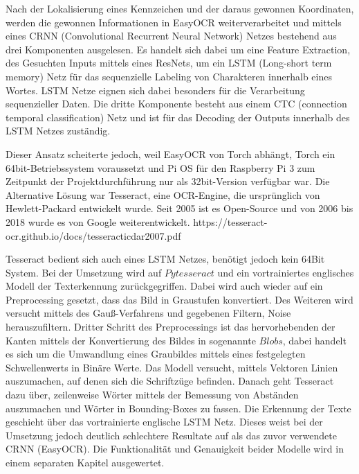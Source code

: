 Nach der Lokalisierung eines Kennzeichen und der daraus gewonnen Koordinaten, werden die gewonnen Informationen in EasyOCR weiterverarbeitet und mittels eines CRNN (Convolutional Recurrent Neural Network) Netzes bestehend aus drei Komponenten ausgelesen. Es handelt sich dabei um eine Feature Extraction, des Gesuchten Inputs mittels eines ResNets, um ein LSTM (Long-short term memory) Netz für das sequenzielle Labeling von Charakteren innerhalb eines Wortes. LSTM Netze eignen sich dabei besonders für die Verarbeitung sequenzieller Daten. Die dritte Komponente besteht aus einem CTC (connection temporal classification) Netz und ist für das Decoding der Outputs innerhalb des LSTM Netzes zuständig. \autocite[Vgl.][]{JaidedAI70}

Dieser Ansatz scheiterte jedoch, weil EasyOCR von Torch abhängt, Torch ein 64bit-Betriebssystem voraussetzt und Pi OS für den Raspberry Pi 3 zum Zeitpunkt der Projektdurchführung nur als 32bit-Version verfügbar war.
Die Alternative Lösung war Tesseract, eine OCR-Engine, die ursprünglich von Hewlett-Packard entwickelt wurde. Seit 2005 ist es Open-Source und von 2006 bis 2018 wurde es von Google weiterentwickelt. https://tesseract-ocr.github.io/docs/tesseracticdar2007.pdf %

Tesseract bedient sich auch eines LSTM Netzes, benötigt jedoch kein 64Bit System. Bei der Umsetzung wird auf $Pytesseract$ und ein vortrainiertes englisches Modell der Texterkennung zurückgegriffen. \autocite[Vgl.][]{Tesserac98}
Dabei wird auch wieder auf ein Preprocessing gesetzt, dass das Bild in Graustufen konvertiert. Des Weiteren wird versucht mittels des Gauß-Verfahrens und gegebenen Filtern, Noise herauszufiltern. Dritter Schritt des Preprocessings ist das hervorhebenden der Kanten mittels der Konvertierung des Bildes in sogenannte $Blobs$, dabei handelt es sich um die Umwandlung eines Graubildes mittels eines festgelegten Schwellenwerts in Binäre Werte. \autocite[Vgl.][]{8974469} %
Das Modell versucht, mittels Vektoren Linien auszumachen, auf denen sich die Schriftzüge befinden. Danach geht Tesseract dazu über, zeilenweise Wörter mittels der Bemessung von Abständen auszumachen und Wörter in Bounding-Boxes zu fassen. Die Erkennung der Texte geschieht über das vortrainierte englische LSTM Netz. Dieses weist bei der Umsetzung jedoch deutlich schlechtere Resultate auf als das zuvor verwendete CRNN (EasyOCR). Die Funktionalität und Genauigkeit beider Modelle wird in einem separaten Kapitel ausgewertet. %

